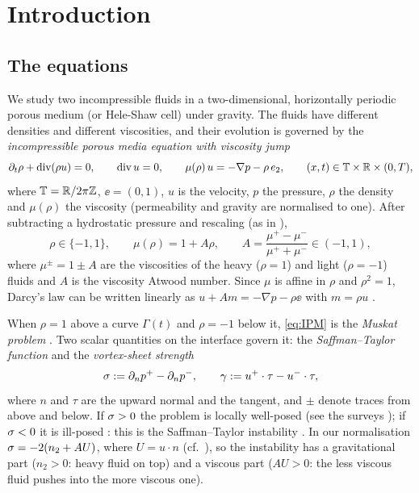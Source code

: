 \section{Introduction}\label{sec:intro}

\subsection{The equations}
We study two incompressible fluids in a two-dimensional, horizontally periodic porous medium (or Hele-Shaw cell) under gravity. The fluids have different densities and
different viscosities, and their evolution is governed by the \emph{incompressible porous media equation with viscosity jump}
\begin{equation}\label{eq:IPM}
\partial_t\rho+\operatorname{div}(\rho u)=0,\qquad \operatorname{div} u=0,\qquad \mu(\rho)\,u=-\nabla p-\rho\,e_2,\qquad (x,t)\in\mathbb{T}\times\mathbb{R}\times(0,T),
\end{equation}
where $\mathbb{T}=\mathbb{R}/2\pi\mathbb Z$, $\ee=(0,1)$, $u$ is the velocity, $p$ the pressure, $\rho$ the density and $\mu(\rho)$ the viscosity (permeability and gravity are normalised to one).
After subtracting a hydrostatic pressure and rescaling (as in \cite[Sec.~1.1]{LM26}),
\begin{equation}\label{eq:normalisation}
\rho\in\{-1,1\},\qquad \mu(\rho)=1+A\rho,\qquad A=\frac{\mu^+-\mu^-}{\mu^++\mu^-}\in(-1,1),
\end{equation}
where $\mu^\pm=1\pm A$ are the viscosities of the heavy ($\rho=1$) and light ($\rho=-1$) fluids and $A$ is the viscosity Atwood number. Since $\mu$ is affine in $\rho$ and
$\rho^2=1$, Darcy's law can be written linearly as $u+Am=-\nabla p-\rho\ee$ with $m=\rho u$ \cite{Men22}.

When $\rho=1$ above a curve $\Gamma(t)$ and $\rho=-1$ below it, \eqref{eq:IPM} is the \emph{Muskat problem} \cite{Mus34}. Two scalar quantities on the interface govern it:
the \emph{Saffman--Taylor function} and the \emph{vortex-sheet strength}
\begin{equation}\label{eq:sigma-gamma}
\sigma:=\partial_np^+-\partial_np^-,\qquad \gamma:=u^+\cdot\tau-u^-\cdot\tau,
\end{equation}
where $n$ and $\tau$ are the upward normal and the tangent, and $\pm$ denote traces from above and below. If $\sigma>0$ the problem is locally well-posed
\cite{Amb04,CG07,CCG11,Mat19,NP20} (see the surveys \cite{Gan17,GBL20}); if $\sigma<0$ it is ill-posed \cite{SCH04,CG07}: this is the Saffman--Taylor instability \cite{ST58,Hom87}.
In our normalisation $\sigma=-2(n_2+AU)$, where $U=u\cdot n$ (cf.\ \cite[(3.8)]{LM26}), so the instability has a gravitational part ($n_2>0$: heavy fluid on top) and a viscous part ($AU>0$: the less viscous fluid
pushes into the more viscous one).

